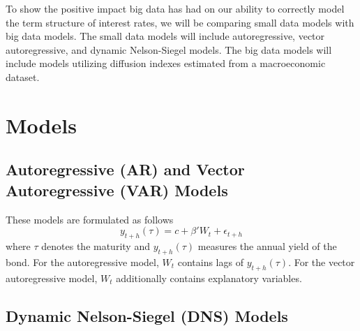To show the positive impact big data has had on our ability to correctly model the term structure of interest rates, we will be comparing small data models with big data models. The small data models will include autoregressive, vector autoregressive, and dynamic Nelson-Siegel models. The big data models will include models utilizing diffusion indexes estimated from a macroeconomic dataset. 

\section{Models}
\subsection{Autoregressive (AR) and Vector Autoregressive (VAR) Models}
These models are formulated as follows
\[
y_{t+h}(\tau) = c + \beta' W_t + \epsilon_{t+h}
\]
where $\tau$ denotes the maturity and $y_{t+h}(\tau)$ measures the annual yield of the bond. For the autoregressive model, $W_t$ contains lags of $y_{t+h}(\tau)$. For the vector autoregressive model, $W_t$ additionally contains explanatory variables. 

\subsection{Dynamic Nelson-Siegel (DNS) Models}

